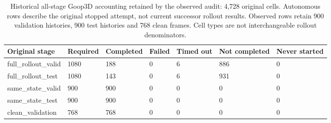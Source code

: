 \begin{table}[p]
\centering\scriptsize
\caption{Historical all-stage Goop3D accounting retained by the observed audit: 4,728 original cells. Autonomous rows describe the original stopped attempt, not current successor rollout results. Observed rows retain 900 validation histories, 900 test histories and 768 clean frames. Cell types are not interchangeable rollout denominators.}
\label{tab:goop3d25k-original-accounting}
\setlength{\tabcolsep}{3pt}
\begin{tabular}{lllllll}
\toprule
Original stage & Required & Completed & Failed & Timed out & Not completed & Never started\\
\midrule
full\_rollout\_valid & 1080 & 188 & 0 & 6 & 886 & 0\\
full\_rollout\_test & 1080 & 143 & 0 & 6 & 931 & 0\\
same\_state\_valid & 900 & 900 & 0 & 0 & 0 & 0\\
same\_state\_test & 900 & 900 & 0 & 0 & 0 & 0\\
clean\_validation & 768 & 768 & 0 & 0 & 0 & 0\\
\bottomrule
\end{tabular}
\end{table}

